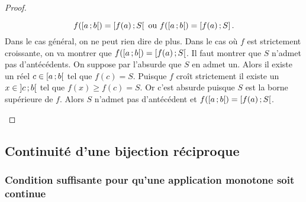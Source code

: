 \begin{proof}
\begin{enumerate}
\begin{equation}
      f(\left[ a \, ;  b \right[) = \left[ f(a) \, ;  S \right[ \text{~ou~} f(\left[ a \, ;  b \right[) = \left[ f(a) \, ;  S \right].
    \end{equation}
    Dans le cas général, on ne peut rien dire de plus. Dans le cas où $f$ est strictement croissante, on va montrer que $f(\left[ a \, ;  b \right[) = \left[ f(a) \, ;  S \right[$. Il faut montrer que $S$ n'admet pas d'antécédents. On suppose par l'absurde que $S$ en admet un. Alors il existe un réel $c \in \left[ a \, ;  b \right[$ tel que $f(c)=S$. Puisque $f$ croît strictement il existe un $x \in \left] c \, ;  b \right[$ tel que $f(x) \geq f(c)=S$. Or c'est absurde puisque $S$ est la borne supérieure de $f$. Alors $S$ n'admet pas d'antécédent et $f(\left[ a \, ;  b \right[) = \left[ f(a) \, ;  S \right[$.
  \end{enumerate}
\end{proof}

\subsection{Continuité d'une bijection réciproque}

\subsubsection[Pour qu'une application monotone soit continue]{Condition suffisante pour qu'une application monotone soit continue}

